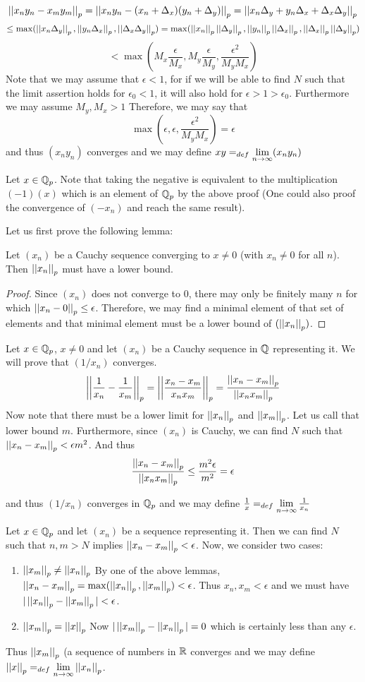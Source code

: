 \[\left|\left| x_ny_n - x_my_m \right|\right|_p = \left|\left| x_ny_n - (x_n +\Delta_x)(y_n+\Delta_y) \right|\right|_p = \left|\left| x_n\Delta_y + y_n\Delta_x + \Delta_x\Delta_y \right|\right|_p  \] \[
\leq \max(\left|\left| x_n\Delta_y \right|\right|_p, \left|\left| y_n\Delta_x \right|\right|_p, \left|\left| \Delta_x\Delta_y \right|\right|_p) = \max(\left|\left| x_n \right|\right|_p\left|\left| \Delta_y \right|\right|_p, \left|\left| y_n \right|\right|_p\left|\left| \Delta_x \right|\right|_p, \left|\left| \Delta_x \right|\right|_p\left|\left| \Delta_y \right|\right|_p)  \]
\[ 
< \max\left(M_x\frac{\epsilon}{M_x},M_y\frac{\epsilon}{M_y},\frac{\epsilon^2}{M_yM_x}\right)
 \]
 Note that we may assume that $\epsilon<1$, for if we will be able to find $N$ such that the limit assertion holds for $\epsilon_0<1$, it will also hold for $\epsilon>1>\epsilon_0$. Furthermore we may assume $M_y,M_x>1$ Therefore, we may say that
 \[ \max\left(\epsilon,\epsilon,\frac{\epsilon^2}{M_yM_x}\right) = \epsilon \]
and thus $(x_ny_n)$ converges and we may define $xy=_{def}\lim\limits_{n\to\infty} (x_ny_n)$
\par{}
Let $x\in \mathbb{Q}_p$. Note that taking the negative is equivalent to the multiplication $(-1)(x)$ which is an element of $\mathbb{Q}_p$ by the above proof (One could also proof the convergence of $(-x_n)$ and reach the same result).
\par{}
Let us first prove the following lemma:
\begin{lemma}
Let $(x_n)$ be a Cauchy sequence converging to $x\neq0$ (with $x_n\neq 0$ for all $n$).  Then $\left|\left| x_n \right|\right|_p$ must have a lower bound. 
\begin{proof}
Since $(x_n)$ does not converge to 0, there may only be finitely many $n$ for which $\left|\left| x_n-0 \right|\right|_p \leq \epsilon$. Therefore, we may find a minimal element of that set of elements and that minimal element must be a lower bound of $(\left|\left| x_n \right|\right|_p)$.
\end{proof} 
\end{lemma}
Let $x\in \mathbb{Q}_p$, $x\neq 0$ and let $(x_n)$ be a Cauchy sequence in $\mathbb{Q}$ representing it. We will prove that $(1/x_n)$  converges.
\[ \left|\left| \frac{1}{x_n}-\frac{1}{x_m} \right|\right|_p = \left|\left| \frac{x_n-x_m}{x_nx_m} \right|\right|_p = \dfrac{\left|\left| x_n-x_m \right|\right|_p}{\left|\left| x_nx_m \right|\right|_p} \] Now note that there must be a lower limit for $\left|\left| x_n \right|\right|_p$ and $\left|\left| x_m \right|\right|_p$. Let us call that lower bound $m$. Furthermore, since $(x_n)$ is Cauchy, we can find $N$ such that  $\left|\left| x_n-x_m \right|\right|_p<\epsilon m^2$. And thus 
\[ \dfrac{\left|\left| x_n-x_m \right|\right|_p}{\left|\left| x_nx_m \right|\right|_p} \leq \frac{m^2\epsilon}{m^2}  = \epsilon \]

 and thus $(1/x_n)$ converges in $\mathbb{Q}_p$ and we may define $\frac{1}{x}=_{def} \lim\limits_{n\to\infty} \frac{1}{x_n}$
\par{} 
Let $x\in \mathbb{Q}_p$ and let $(x_n)$ be a sequence representing it. 
Then we can find $N$ such that $n,m>N$ implies $\left|\left| x_n-x_m \right|\right|_p<\epsilon$. Now, we consider two cases:
\begin{enumerate}
\item $\left|\left| x_m \right|\right|_p \neq \left|\left| x_n \right|\right|_p$
	By one of the above lemmas, $\left|\left| x_n-x_m \right|\right|_p=\max(\left|\left| x_n \right|\right|_p,\left|\left| x_m \right|\right|_p) < \epsilon$. Thus $x_n, x_m < \epsilon$ and we must have $|\left|\left| x_n \right|\right|_p-\left|\left| x_m \right|\right|_p|<\epsilon$.
\item $\left|\left| x_m \right|\right|_p = \left|\left| x \right|\right|_p$
Now $|\left|\left| x_m \right|\right|_p - \left|\left| x_n \right|\right|_p| = 0$ which is certainly less than any $\epsilon$.

\end{enumerate}
Thus $\left|\left| x_m \right|\right|_p$ (a sequence of numbers in $\mathbb{R}$ converges and we may define $\left|\left| x \right|\right|_p=_{def} \lim\limits_{n\to\infty} \left|\left| x_n \right|\right|_p$.
